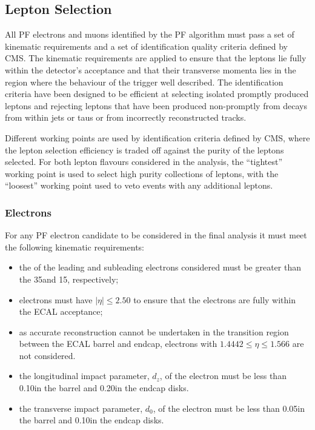 \subsection{Lepton Selection}
All PF electrons and muons identified by the PF algorithm must pass a set of kinematic requirements and a set of identification quality criteria defined by CMS.
The kinematic requirements are applied to ensure that the leptons lie fully within the detector's acceptance and that their transverse momenta lies in the region where the behaviour of the trigger well described.
The identification criteria have been designed to be efficient at selecting isolated promptly produced  leptons and rejecting leptons that have been produced non-promptly from decays from within jets or taus or from incorrectly reconstructed tracks.

Different working points are used by identification criteria defined by CMS, where the lepton selection efficiency is traded off against the purity of the leptons selected.
For both lepton flavours considered in the analysis, the ``tightest'' working point is used to select high purity collections of leptons, with the ``loosest'' working point used to veto events with any additional leptons.

\subsubsection{Electrons}\label{subsubsec:electronSelection}
For any PF electron candidate to be considered in the final analysis it must meet the following kinematic requirements:

\begin{itemize}
\item the \pt of the leading and subleading electrons considered must be greater than the 35\GeVc and 15\GeVc, respectively;
\item electrons must have $|\eta| \leq 2.50$ to ensure that the electrons are fully within the ECAL acceptance;
\item as accurate reconstruction cannot be undertaken in the transition region between the ECAL barrel and endcap, electrons with $1.4442 \leq \eta \leq 1.566$ are not considered.
\item the longitudinal impact parameter, $d_{z}$, of the electron must be less than 0.10\cm in the barrel and 0.20\cm in the endcap disks.
\item the transverse impact parameter, $d_{0}$, of the electron must be less than 0.05\cm in the barrel and 0.10\cm in the endcap disks.
\end{itemize}

